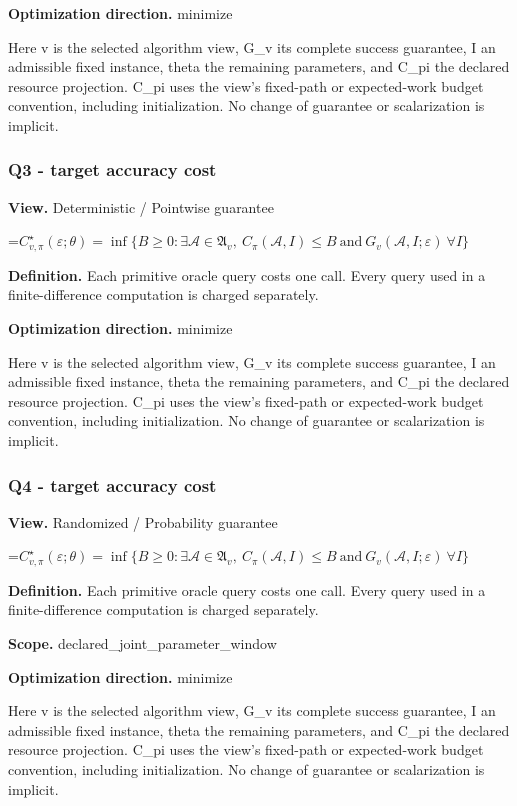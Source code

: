 \documentclass[10pt,a4paper]{article}
\newcommand{\AtlasMath}[1]{\par\begingroup\centering\setbox0=\hbox{$\displaystyle #1$}\ifdim\wd0>1.4\linewidth\typeout{ATLAS WIDE FORMULA: \the\wd0}\fi\ifdim\wd0>\linewidth\resizebox{\linewidth}{!}{\box0}\else\box0\fi\par\endgroup}
\begin{document}
\textbf{Optimization direction.} minimize

Here v is the selected algorithm view, G\_v its complete success guarantee, I an admissible fixed instance, theta the remaining parameters, and C\_pi the declared resource projection. C\_pi uses the view's fixed-path or expected-work budget convention, including initialization. No change of guarantee or scalarization is implicit.

\subsubsection{Q3 - target accuracy cost}
\textbf{View.} Deterministic / Pointwise guarantee

\AtlasMath{C^\star_{v,\pi}(\varepsilon;\theta)=\inf\{B\ge0:\exists\mathcal A\in\mathfrak A_v,\ C_\pi(\mathcal A,I)\le B\ \text{and}\ G_v(\mathcal A,I;\varepsilon)\ \forall I\}}
\textbf{Definition.} Each primitive oracle query costs one call. Every query used in a finite-difference computation is charged separately.

\textbf{Optimization direction.} minimize

Here v is the selected algorithm view, G\_v its complete success guarantee, I an admissible fixed instance, theta the remaining parameters, and C\_pi the declared resource projection. C\_pi uses the view's fixed-path or expected-work budget convention, including initialization. No change of guarantee or scalarization is implicit.

\subsubsection{Q4 - target accuracy cost}
\textbf{View.} Randomized / Probability guarantee

\AtlasMath{C^\star_{v,\pi}(\varepsilon;\theta)=\inf\{B\ge0:\exists\mathcal A\in\mathfrak A_v,\ C_\pi(\mathcal A,I)\le B\ \text{and}\ G_v(\mathcal A,I;\varepsilon)\ \forall I\}}
\textbf{Definition.} Each primitive oracle query costs one call. Every query used in a finite-difference computation is charged separately.

\textbf{Scope.} declared\_joint\_parameter\_window

\textbf{Optimization direction.} minimize

Here v is the selected algorithm view, G\_v its complete success guarantee, I an admissible fixed instance, theta the remaining parameters, and C\_pi the declared resource projection. C\_pi uses the view's fixed-path or expected-work budget convention, including initialization. No change of guarantee or scalarization is implicit.
\end{document}
